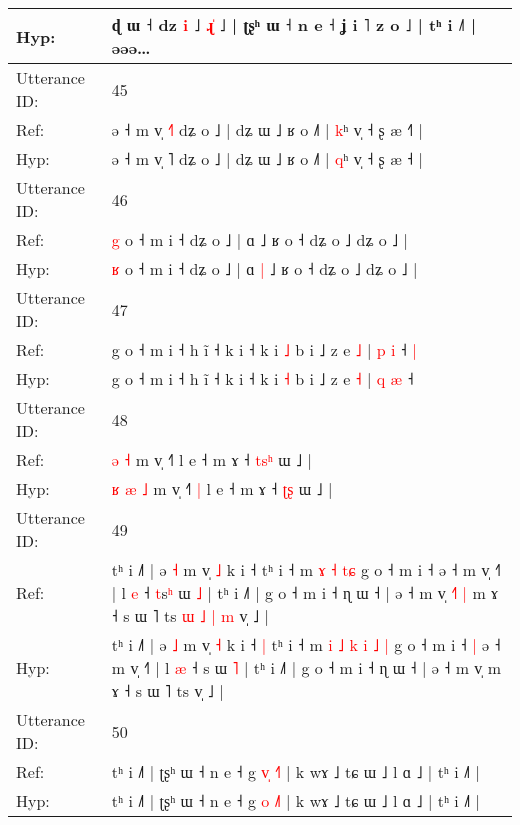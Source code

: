 \documentclass[10pt]{article}
\DeclareRobustCommand{\hl}[1]{{\textcolor{red}{#1}}}
\begin{document}
\begin{longtable}{ll}
 \\
Hyp: & ɖ ɯ ˧ dz \hl{i} ˩ \hl{}\hl{ɻ}\hl{̍} ˩ | ʈʂʰ ɯ ˧ n e ˧ ʝ i ˥ z o ˩ | tʰ i ˩˥ | əəə…
 \\
\midrule
Utterance ID: & 45 \\
Ref: & ə ˧ m v̩ \hl{˧}˥ dʑ o ˩ | dʑ ɯ ˩ ʁ o ˩˥ | \hl{k}ʰ v̩ ˧ ʂ æ ˧\hl{˥} |
 \\
Hyp: & ə ˧ m v̩ \hl{}˥ dʑ o ˩ | dʑ ɯ ˩ ʁ o ˩˥ | \hl{q}ʰ v̩ ˧ ʂ æ ˧\hl{} |
 \\
\midrule
Utterance ID: & 46 \\
Ref: & \hl{g} o ˧ m i ˧ dʑ o ˩ | ɑ\hl{}\hl{} ˩ ʁ o ˧ dʑ o ˩ dʑ o ˩ |
 \\
Hyp: & \hl{ʁ} o ˧ m i ˧ dʑ o ˩ | ɑ\hl{ }\hl{|} ˩ ʁ o ˧ dʑ o ˩ dʑ o ˩ |
 \\
\midrule
Utterance ID: & 47 \\
Ref: & g o ˧ m i ˧ h ĩ ˧ k i ˧ k i \hl{˩} b i ˩ z e \hl{˩} | \hl{p} \hl{i} ˧\hl{ }\hl{|}
 \\
Hyp: & g o ˧ m i ˧ h ĩ ˧ k i ˧ k i \hl{˧} b i ˩ z e \hl{˧} | \hl{q} \hl{æ} ˧\hl{}\hl{}
 \\
\midrule
Utterance ID: & 48 \\
Ref: & \hl{}\hl{}\hl{ə} \hl{˧} m v̩ ˧˥\hl{}\hl{} l e ˧ m ɤ ˧ \hl{t}\hl{s}\hl{ʰ} ɯ ˩ |
 \\
Hyp: & \hl{ʁ}\hl{ }\hl{æ} \hl{˩} m v̩ ˧˥\hl{ }\hl{|} l e ˧ m ɤ ˧ \hl{}\hl{ʈ}\hl{ʂ} ɯ ˩ |
 \\
\midrule
Utterance ID: & 49 \\
Ref: & tʰ i ˩˥ | ə \hl{˧} m v̩ \hl{˩} k i ˧\hl{}\hl{} tʰ i ˧ m\hl{}\hl{}\hl{}\hl{} \hl{ɤ} \hl{˧} \hl{}\hl{t}\hl{ɕ} g o ˧ m i ˧\hl{}\hl{} ə ˧ m v̩ ˧˥ | l \hl{e} ˧ \hl{t}s\hl{ʰ} ɯ \hl{˩} | tʰ i ˩˥ | g o ˧ m i ˧ ɳ ɯ ˧ | ə ˧ m v̩\hl{ }\hl{˧}\hl{˥}\hl{ }\hl{|} m ɤ ˧ s ɯ ˥ ts\hl{ }\hl{ɯ}\hl{ }\hl{˩}\hl{ }\hl{|}\hl{ }\hl{m} v̩ ˩ |
 \\
Hyp: & tʰ i ˩˥ | ə \hl{˩} m v̩ \hl{˧} k i ˧\hl{ }\hl{|} tʰ i ˧ m\hl{ }\hl{i}\hl{ }\hl{˩} \hl{k} \hl{i} \hl{˩}\hl{ }\hl{|} g o ˧ m i ˧\hl{ }\hl{|} ə ˧ m v̩ ˧˥ | l \hl{æ} ˧ \hl{}s\hl{} ɯ \hl{˥} | tʰ i ˩˥ | g o ˧ m i ˧ ɳ ɯ ˧ | ə ˧ m v̩\hl{}\hl{}\hl{}\hl{}\hl{} m ɤ ˧ s ɯ ˥ ts\hl{}\hl{}\hl{}\hl{}\hl{}\hl{}\hl{}\hl{} v̩ ˩ |
 \\
\midrule
Utterance ID: & 50 \\
Ref: & tʰ i ˩˥ | ʈʂʰ ɯ ˧ n e ˧ g \hl{v}\hl{̩} \hl{˧}˥ | k wɤ ˩ tɕ ɯ ˩ l ɑ ˩ | tʰ i ˩˥ |
 \\
Hyp: & tʰ i ˩˥ | ʈʂʰ ɯ ˧ n e ˧ g \hl{}\hl{o} \hl{˩}˥ | k wɤ ˩ tɕ ɯ ˩ l ɑ ˩ | tʰ i ˩˥ |
 \\
\midrule

\end{longtable}
\end{document}
